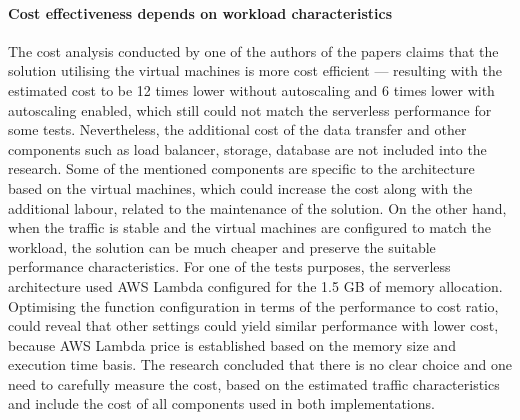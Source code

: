 \paragraph{Cost effectiveness depends on workload characteristics}

The cost analysis conducted by one of the authors of the papers \cite{ServerlessComputingAnInvestigationOfDeploymentEnvironmentsForWebAPIs} claims that the solution utilising the virtual machines is more cost efficient --- resulting with the estimated cost to be 12 times lower without autoscaling and 6 times lower with autoscaling enabled, which still could not match the serverless performance for some tests.
Nevertheless, the additional cost of the data transfer and other components such as load balancer, storage, database are not included into the research.
Some of the mentioned components are specific to the architecture based on the virtual machines, which could increase the cost along with the additional labour, related to the maintenance of the solution.
On the other hand, when the traffic is stable and the virtual machines are configured to match the workload, the solution can be much cheaper and preserve the suitable performance characteristics.
For one of the tests purposes, the serverless architecture used AWS Lambda configured for the 1.5 GB of memory allocation. Optimising the function configuration in terms of the performance to cost ratio, could reveal that other settings could yield similar performance with lower cost, because AWS Lambda price is established based on the memory size and execution time basis.
The research concluded that there is no clear choice and one need to carefully measure the cost, based on the estimated traffic characteristics and include the cost of all components used in both implementations.






